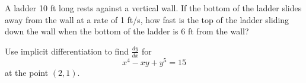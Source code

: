\documentclass[11pt, addpoints]{exam}
\begin{document}
\begin{questions}
\question[12] A ladder 10 ft long rests against a vertical wall. If the bottom of the ladder slides away from the wall at a rate of 1 ft/s, how fast is the top of the ladder sliding down the wall when the bottom of the ladder is 6 ft from the wall? 

\pagebreak

\question[8] Use implicit differentiation to find $\frac{dy}{dx}$ for $$x^4-xy+y^5=15$$ at the point $(2,1).$
\end{questions}
    
\end{document}
